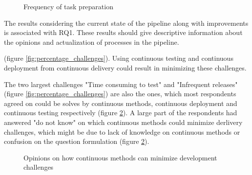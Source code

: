 \begin{figure}%
  \centering
  \caption{Frequency of task preparation}
  \label{fig:frequency_of_task_preparation}
\end{figure}



The results considering the current state of the pipeline along with improvements is associated with RQ1. These results should give descriptive information about the opinions and actualization of processes in the pipeline.

 (figure \ref{fig:percentage_challenges}). Using continuous testing and continuous deployment from continuous delivery could result in minimizing these challenges. 


The two largest challenges "Time consuming to test" and "Infrequent releases" (figure \ref{fig:percentage_challenges}) are also the ones, which most respondents agreed on could be solves by continuous methods, continuous deployment and continuous testing respectively (figure \ref{fig:percentage_minimizing_challenges}). 
A large part of the respondents had answered "do not know" on which continuous methods could minimize derlivery challenges, which might be due to lack of knowledge on continuous methods or confusion on the question formulation (figure \ref{fig:percentage_minimizing_challenges}).


\begin{figure}%
\centering
{}
\caption{Opinions on how continuous methods can minimize  development challenges}
\label{fig:percentage_minimizing_challenges}
\end{figure}


